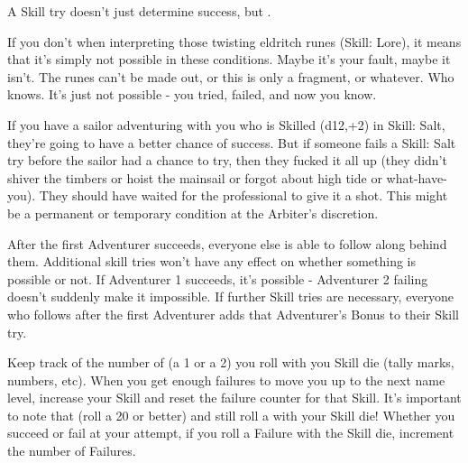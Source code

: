 \begin{multicols*}{2}

A \RO Skill try doesn't just determine success, but .  

If you don't \RO when interpreting those twisting eldritch runes (Skill: Lore), it means that it's simply not possible in these conditions.  Maybe it's your fault, maybe it isn't.  The runes can't be made out, or this is only a fragment, or whatever.  Who knows.  It's just not possible - you tried, failed, and now you know.

If you have a sailor adventuring with you who is Skilled (d12,+2) in Skill: Salt, they're going to have a better chance of success.  But if someone fails a Skill: Salt try before the sailor had a chance to try, then they fucked it all up (they didn't shiver the timbers or hoist the mainsail or forgot about high tide or what-have-you).  They should have waited for the professional to give it a shot.  This might be a permanent or temporary condition at the Arbiter's discretion.

After the first Adventurer succeeds, everyone else is able to follow along behind them.  Additional skill tries won't have any effect on whether something is possible or not.  If Adventurer 1 succeeds, it's possible - Adventurer 2 failing doesn't suddenly make it impossible.  If further Skill tries are necessary, everyone who follows after the first Adventurer adds that Adventurer's Bonus to their Skill try.



Keep track of the number of  (a 1 or a 2) you roll with you Skill die (tally marks, numbers, etc). When you get enough failures to move you up to the next name level, increase your Skill and reset the failure counter for that Skill. It's important to note that  (roll a 20 or better) and still roll a  with your Skill die! Whether you succeed or fail at your \RO attempt, if you roll a Failure with the Skill die, increment the number of Failures.



\end{multicols*}
